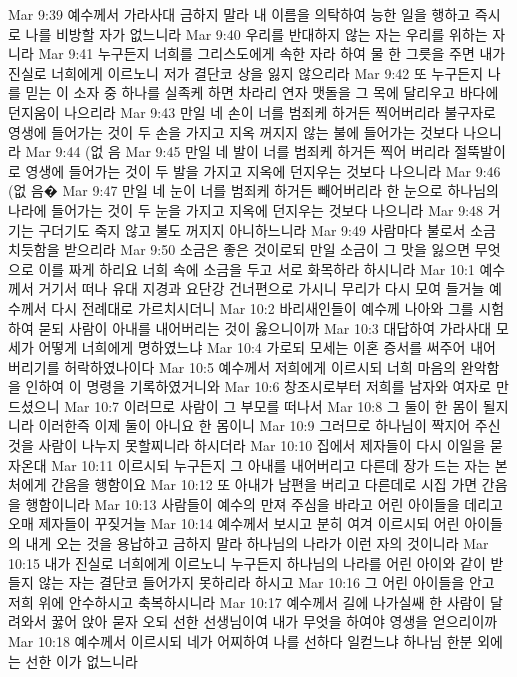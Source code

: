 Mar 9:39  예수께서 가라사대 금하지 말라 내 이름을 의탁하여 능한 일을 행하고 즉시로 나를 비방할 자가 없느니라
Mar 9:40  우리를 반대하지 않는 자는 우리를 위하는 자니라
Mar 9:41  누구든지 너희를 그리스도에게 속한 자라 하여 물 한 그릇을 주면 내가 진실로 너희에게 이르노니 저가 결단코 상을 잃지 않으리라
Mar 9:42  또 누구든지 나를 믿는 이 소자 중 하나를 실족케 하면 차라리 연자 맷돌을 그 목에 달리우고 바다에 던지움이 나으리라
Mar 9:43  만일 네 손이 너를 범죄케 하거든 찍어버리라 불구자로 영생에 들어가는 것이 두 손을 가지고 지옥 꺼지지 않는 불에 들어가는 것보다 나으니라
Mar 9:44  (없 음
Mar 9:45  만일 네 발이 너를 범죄케 하거든 찍어 버리라 절뚝발이로 영생에 들어가는 것이 두 발을 가지고 지옥에 던지우는 것보다 나으니라
Mar 9:46  (없 음�
Mar 9:47  만일 네 눈이 너를 범죄케 하거든 빼어버리라 한 눈으로 하나님의 나라에 들어가는 것이 두 눈을 가지고 지옥에 던지우는 것보다 나으니라
Mar 9:48  거기는 구더기도 죽지 않고 불도 꺼지지 아니하느니라
Mar 9:49  사람마다 불로서 소금 치듯함을 받으리라
Mar 9:50  소금은 좋은 것이로되 만일 소금이 그 맛을 잃으면 무엇으로 이를 짜게 하리요 너희 속에 소금을 두고 서로 화목하라 하시니라
Mar 10:1  예수께서 거기서 떠나 유대 지경과 요단강 건너편으로 가시니 무리가 다시 모여 들거늘 예수께서 다시 전례대로 가르치시더니
Mar 10:2  바리새인들이 예수께 나아와 그를 시험하여 묻되 사람이 아내를 내어버리는 것이 옳으니이까
Mar 10:3  대답하여 가라사대 모세가 어떻게 너희에게 명하였느냐
Mar 10:4  가로되 모세는 이혼 증서를 써주어 내어 버리기를 허락하였나이다
Mar 10:5  예수께서 저희에게 이르시되 너희 마음의 완악함을 인하여 이 명령을 기록하였거니와
Mar 10:6  창조시로부터 저희를 남자와 여자로 만드셨으니
Mar 10:7  이러므로 사람이 그 부모를 떠나서
Mar 10:8  그 둘이 한 몸이 될지니라 이러한즉 이제 둘이 아니요 한 몸이니
Mar 10:9  그러므로 하나님이 짝지어 주신 것을 사람이 나누지 못할찌니라 하시더라
Mar 10:10  집에서 제자들이 다시 이일을 묻자온대
Mar 10:11  이르시되 누구든지 그 아내를 내어버리고 다른데 장가 드는 자는 본처에게 간음을 행함이요
Mar 10:12  또 아내가 남편을 버리고 다른데로 시집 가면 간음을 행함이니라
Mar 10:13  사람들이 예수의 만져 주심을 바라고 어린 아이들을 데리고 오매 제자들이 꾸짖거늘
Mar 10:14  예수께서 보시고 분히 여겨 이르시되 어린 아이들의 내게 오는 것을 용납하고 금하지 말라 하나님의 나라가 이런 자의 것이니라
Mar 10:15  내가 진실로 너희에게 이르노니 누구든지 하나님의 나라를 어린 아이와 같이 받들지 않는 자는 결단코 들어가지 못하리라 하시고
Mar 10:16  그 어린 아이들을 안고 저희 위에 안수하시고 축복하시니라
Mar 10:17  예수께서 길에 나가실쌔 한 사람이 달려와서 꿇어 앉아 묻자 오되 선한 선생님이여 내가 무엇을 하여야 영생을 얻으리이까
Mar 10:18  예수께서 이르시되 네가 어찌하여 나를 선하다 일컫느냐 하나님 한분 외에는 선한 이가 없느니라
